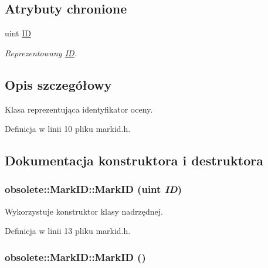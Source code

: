 \subsection*{Atrybuty chronione}
\begin{DoxyCompactItemize}
\item 
uint \hyperlink{classobsolete_1_1AbstractID_a5f67fa1c7d96085f0ef41193b60b570c}{ID}
\begin{DoxyCompactList}\small\item\em Reprezentowany \hyperlink{classobsolete_1_1ID}{ID}. \item\end{DoxyCompactList}\end{DoxyCompactItemize}


\subsection{Opis szczegółowy}
Klasa reprezentująca identyfikator oceny. 

Definicja w linii 10 pliku markid.h.



\subsection{Dokumentacja konstruktora i destruktora}
\hypertarget{classobsolete_1_1MarkID_a451629e8562c9b4283835873d0416966}{
\subsubsection[{MarkID}]{\setlength{\rightskip}{0pt plus 5cm}obsolete::MarkID::MarkID (uint {\em ID})}}
\label{classobsolete_1_1MarkID_a451629e8562c9b4283835873d0416966}


Wykorzystuje konstruktor klasy nadrzędnej. 



Definicja w linii 13 pliku markid.h.

\hypertarget{classobsolete_1_1MarkID_a255fecd21149b8421bab3be478b821c9}{
\subsubsection[{MarkID}]{\setlength{\rightskip}{0pt plus 5cm}obsolete::MarkID::MarkID ()}}
\label{classobsolete_1_1MarkID_a255fecd21149b8421bab3be478b821c9}


